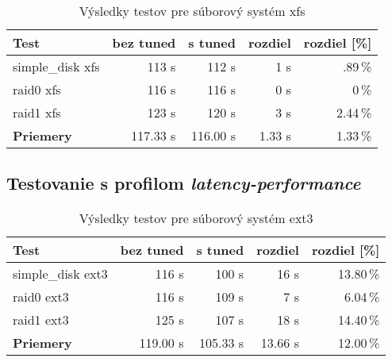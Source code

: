 \begin{table}[H]
\begin{center}
\begin{tabular}{|l|r|r|r|r|}
    \hline
    \textbf{Test} & \textbf{bez tuned} & \textbf{s tuned} & \textbf{rozdiel} & \textbf{rozdiel [\%]} \\ \hline
    simple\_disk xfs & 113 s & 112 s & 1 s & .89\,\% \\
    \hline
    raid0 xfs & 116 s & 116 s & 0 s & 0\,\% \\
    \hline
    raid1 xfs & 123 s & 120 s & 3 s & 2.44\,\% \\
    \hline
    \textbf{Priemery} & 117.33 s & 116.00 s & 1.33 s & 1.33\,\% \\
    \hline
\end{tabular}
\caption{Výsledky testov pre súborový systém xfs}
\label{tab:results-xfs}
\end{center}
\end{table}

\subsection{Testovanie s profilom \emph{latency-performance}}

\begin{table}[H]
\begin{center}
\begin{tabular}{|l|r|r|r|r|}
    \hline
    \textbf{Test} & \textbf{bez tuned} & \textbf{s tuned} & \textbf{rozdiel} & \textbf{rozdiel [\%]} \\ \hline
    simple\_disk ext3 & 116 s & 100 s & 16 s & 13.80\,\% \\
    \hline
    raid0 ext3 & 116 s & 109 s & 7 s & 6.04\,\% \\
    \hline
    raid1 ext3 & 125 s & 107 s & 18 s & 14.40\,\% \\
    \hline
    \textbf{Priemery} & 119.00 s & 105.33 s & 13.66 s & 12.00\,\% \\
    \hline
\end{tabular}
\caption{Výsledky testov pre súborový systém ext3}
\label{tab:results-ext3}
\end{center}
\end{table}

